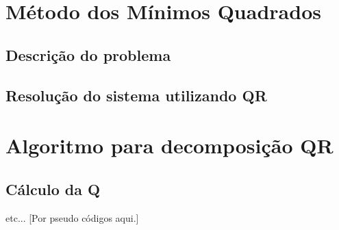 \chapter{Método dos Mínimos Quadrados}

	\section{Descrição do problema}
	
	\section{Resolução do sistema utilizando QR}


\chapter{Algoritmo para decomposição QR}

\section{Cálculo da Q}
etc... [Por pseudo códigos aqui.]